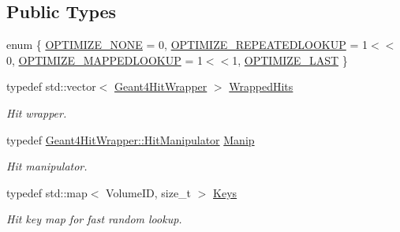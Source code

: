 \subsection*{Public Types}
\begin{DoxyCompactItemize}
\item 
enum \{ \hyperlink{class_d_d4hep_1_1_simulation_1_1_geant4_hit_collection_a8fe757ca872800562e5317df0597c844a534e41b5b4b31668654894c119d79f10}{OPTIMIZE\_\-NONE} =  0, 
\hyperlink{class_d_d4hep_1_1_simulation_1_1_geant4_hit_collection_a8fe757ca872800562e5317df0597c844a3831e14471c6e0e7b8b0349696913ea9}{OPTIMIZE\_\-REPEATEDLOOKUP} =  1$<$$<$0, 
\hyperlink{class_d_d4hep_1_1_simulation_1_1_geant4_hit_collection_a8fe757ca872800562e5317df0597c844a762d4b5ef6144a6b8d6b9f5ae9f70450}{OPTIMIZE\_\-MAPPEDLOOKUP} =  1$<$$<$1, 
\hyperlink{class_d_d4hep_1_1_simulation_1_1_geant4_hit_collection_a8fe757ca872800562e5317df0597c844ac14cd6ddf70dd174f944eca4790515b8}{OPTIMIZE\_\-LAST}
 \}
\item 
typedef std::vector$<$ \hyperlink{class_d_d4hep_1_1_simulation_1_1_geant4_hit_wrapper}{Geant4HitWrapper} $>$ \hyperlink{class_d_d4hep_1_1_simulation_1_1_geant4_hit_collection_ada2cbec73b2d5005b514a33b44a1dc05}{WrappedHits}
\begin{DoxyCompactList}\small\item\em Hit wrapper. \item\end{DoxyCompactList}\item 
typedef \hyperlink{class_d_d4hep_1_1_simulation_1_1_geant4_hit_wrapper_1_1_hit_manipulator}{Geant4HitWrapper::HitManipulator} \hyperlink{class_d_d4hep_1_1_simulation_1_1_geant4_hit_collection_a7a4b540fa0c4983ebd755a049a2794b7}{Manip}
\begin{DoxyCompactList}\small\item\em Hit manipulator. \item\end{DoxyCompactList}\item 
typedef std::map$<$ VolumeID, size\_\-t $>$ \hyperlink{class_d_d4hep_1_1_simulation_1_1_geant4_hit_collection_a0d4d87fb90cf83dceff0b43928426135}{Keys}
\begin{DoxyCompactList}\small\item\em Hit key map for fast random lookup. \item\end{DoxyCompactList}\end{DoxyCompactItemize}
